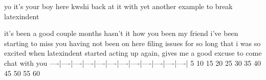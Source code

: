 \begin{myenv}
    yo it's your boy here kwshi back at it with yet another
    example to break latexindent
\end{myenv}
it's been a good couple months hasn't it how you been my
friend i've been starting to miss you having not been on
here filing issues for so long that i was so excited when
latexindent started acting up again, gives me a good excuse
to come chat with you
----|----|----|----|----|----|----|----|----|----|----|----|
   5   10   15   20   25   30   35   40   45   50   55   60